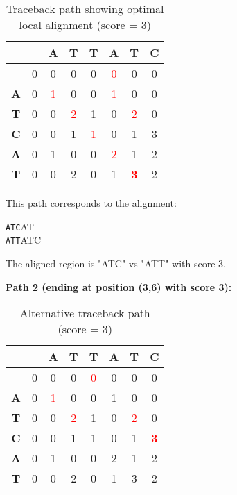 \documentclass[11pt,a4paper]{article}
\theoremstyle{definition}
\theoremstyle{plain}
\theoremstyle{remark}
\begin{document}
\begin{table}[h]
\centering
\begin{tabular}{|c|c|c|c|c|c|c|c|}
\hline
 & & \textbf{A} & \textbf{T} & \textbf{T} & \textbf{A} & \textbf{T} & \textbf{C} \\
\hline
 & 0 & 0 & 0 & 0 & \textcolor{red}{0} & 0 & 0 \\
\hline
\textbf{A} & 0 & \textcolor{red}{1} & 0 & 0 & \textcolor{red}{1} & 0 & 0 \\
\hline
\textbf{T} & 0 & 0 & \textcolor{red}{2} & 1 & 0 & \textcolor{red}{2} & 0 \\
\hline
\textbf{C} & 0 & 0 & 1 & \textcolor{red}{1} & 0 & 1 & 3 \\
\hline
\textbf{A} & 0 & 1 & 0 & 0 & \textcolor{red}{2} & 1 & 2 \\
\hline
\textbf{T} & 0 & 0 & 2 & 0 & 1 & \textcolor{red}{\textbf{3}} & 2 \\
\hline
\end{tabular}
\caption{Traceback path showing optimal local alignment (score = 3)}
\end{table}

This path corresponds to the alignment:
\begin{center}
\texttt{ATC}AT \\
\texttt{ATT}ATC
\end{center}

The aligned region is "ATC" vs "ATT" with score 3.

\textbf{Path 2 (ending at position (3,6) with score 3):}

\begin{table}[h]
\centering
\begin{tabular}{|c|c|c|c|c|c|c|c|}
\hline
 & & \textbf{A} & \textbf{T} & \textbf{T} & \textbf{A} & \textbf{T} & \textbf{C} \\
\hline
 & 0 & 0 & 0 & \textcolor{red}{0} & 0 & 0 & 0 \\
\hline
\textbf{A} & 0 & \textcolor{red}{1} & 0 & 0 & 1 & 0 & 0 \\
\hline
\textbf{T} & 0 & 0 & \textcolor{red}{2} & 1 & 0 & \textcolor{red}{2} & 0 \\
\hline
\textbf{C} & 0 & 0 & 1 & 1 & 0 & 1 & \textcolor{red}{\textbf{3}} \\
\hline
\textbf{A} & 0 & 1 & 0 & 0 & 2 & 1 & 2 \\
\hline
\textbf{T} & 0 & 0 & 2 & 0 & 1 & 3 & 2 \\
\hline
\end{tabular}
\caption{Alternative traceback path (score = 3)}
\end{table}
\end{document}
